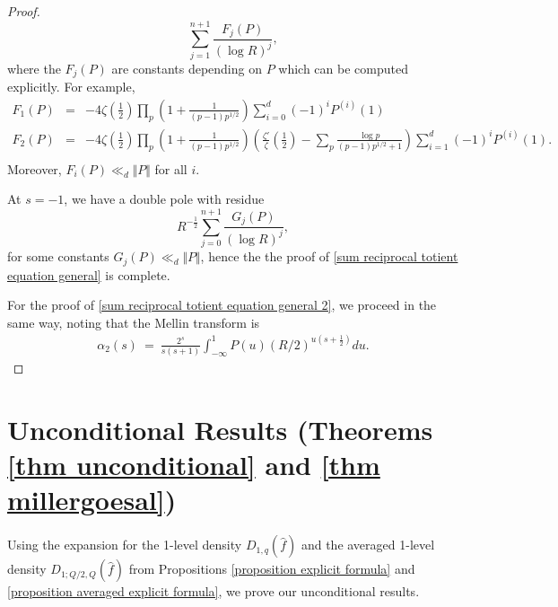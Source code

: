 \documentclass[12pt,reqno]{amsart}
\numberwithin{equation}{section}
\theoremstyle{plain}
\begin{document}
\begin{proof}
\begin{equation} \sum_{j=1}^{n+1} \frac{F_j(P)}{(\log R)^j},\end{equation}
where the $F_j(P)$ are constants depending on $P$ which can be computed explicitly. For example,
\begin{eqnarray} F_1(P) & =&  -4\zeta\left( \frac 12\right) \prod_p \left( 1+\frac 1{(p-1)p^{1/2}}\right) \sum_{i=0}^d (-1)^i P^{(i)}(1) \nonumber\\  F_2(P) &=&  -4\zeta\left( \frac 12\right) \prod_p \left( 1+\frac 1{(p-1)p^{1/2}}\right) \left( \frac{\zeta'}{\zeta}\left( \frac 12 \right)-\sum_p \frac{\log p}{(p-1)p^{1/2} +1} \right) \sum_{i=1}^d (-1)^i P^{(i)}(1).\nonumber\\ \end{eqnarray}
Moreover, $F_i(P) \ll_d \Vert P\Vert$ for all $i$.

At $s=-1$, we have a double pole with residue
\begin{equation} R^{-\frac 12} \sum_{j=0}^{n+1} \frac{G_j(P)}{(\log R)^j}, \end{equation}
for some constants $G_j(P)\ll_d \Vert P \Vert$, hence the the proof of \eqref{sum reciprocal totient equation general} is complete.

For the proof of \eqref{sum reciprocal totient equation general 2}, we proceed in the same way, noting that the Mellin transform is
\begin{eqnarray} \alpha_2(s) \ =\  \frac{2^s}{s(s+1)}\int_{-\infty}^1 P(u) (R/2)^{u(s+\frac 12)}du.
\end{eqnarray}

\end{proof}

\section{Unconditional Results (Theorems \ref{thm unconditional} and \ref{thm millergoesal})}\label{section terms}

Using the expansion for the 1-level density $D_{1,q}(\widehat{f})$ and the averaged 1-level density $D_{1;Q/2,Q}(\widehat{f})$ from Propositions \ref{proposition explicit formula} and \ref{proposition averaged explicit formula}, we prove our unconditional results.
\end{document}
